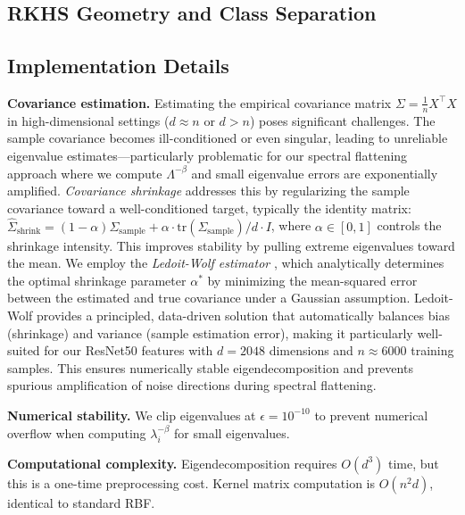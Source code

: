 \documentclass[11pt]{article}
\begin{document}
\subsection{RKHS Geometry and Class Separation}


\subsection{Implementation Details}

\textbf{Covariance estimation.} Estimating the empirical covariance matrix $\Sigma = \frac{1}{n}X^\top X$ in high-dimensional settings ($d \approx n$ or $d > n$) poses significant challenges. The sample covariance becomes ill-conditioned or even singular, leading to unreliable eigenvalue estimates---particularly problematic for our spectral flattening approach where we compute $\Lambda^{-\beta}$ and small eigenvalue errors are exponentially amplified. \emph{Covariance shrinkage} addresses this by regularizing the sample covariance toward a well-conditioned target, typically the identity matrix: $\hat{\Sigma}_{\text{shrink}} = (1-\alpha)\Sigma_{\text{sample}} + \alpha \cdot \text{tr}(\Sigma_{\text{sample}})/d \cdot I$, where $\alpha \in [0,1]$ controls the shrinkage intensity. This improves stability by pulling extreme eigenvalues toward the mean. We employ the \emph{Ledoit-Wolf estimator} \cite{ledoit2004honey}, which analytically determines the optimal shrinkage parameter $\alpha^*$ by minimizing the mean-squared error between the estimated and true covariance under a Gaussian assumption. Ledoit-Wolf provides a principled, data-driven solution that automatically balances bias (shrinkage) and variance (sample estimation error), making it particularly well-suited for our ResNet50 features with $d=2048$ dimensions and $n \approx 6000$ training samples. This ensures numerically stable eigendecomposition and prevents spurious amplification of noise directions during spectral flattening.

\textbf{Numerical stability.} We clip eigenvalues at $\epsilon = 10^{-10}$ to prevent numerical overflow when computing $\lambda_i^{-\beta}$ for small eigenvalues.

\textbf{Computational complexity.} Eigendecomposition requires $O(d^3)$ time, but this is a one-time preprocessing cost. Kernel matrix computation is $O(n^2 d)$, identical to standard RBF.
\end{document}
